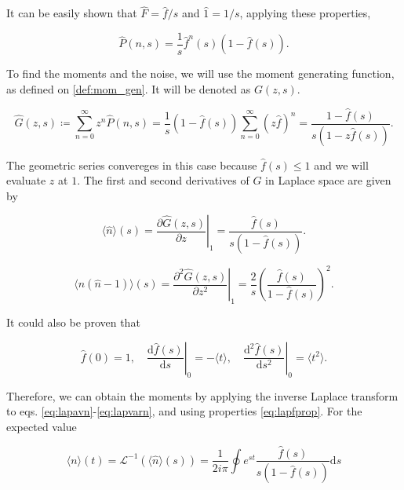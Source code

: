 It can be easily shown that $\hat{F} = \hat{f}/s$ and $\hat{1} = 1/s$, applying these properties,

\begin{equation}
  \label{eq:lapP}
  \hat{P}(n,s) = \frac{1}{s}\hat{f}^n(s)(1-\hat{f}(s)).
\end{equation}

To find the moments and the noise, we will use the moment generating function, as defined on \eqref{def:mom_gen}. It will be denoted as $G(z,s)$.

\begin{equation}
  \label{eq:lapG}
  \hat{G}(z,s) \coloneqq \sum_{n=0}^{\infty}z^n\hat{P}(n,s) = \frac{1}{s}(1-\hat{f}(s))\sum_{n=0}^{\infty}(z\hat{f})^n=\frac{1-\hat{f}(s)}{s(1-z\hat{f}(s))}.
\end{equation}

The geometric series convereges in this case because $\hat{f}(s)\leq1$ and we will evaluate $z$ at $1$. The first and second derivatives of $G$ in Laplace space are given by

\begin{equation}
  \label{eq:lapavn}
  \langle\hat{n}\rangle(s) = \left.\frac{\partial\hat{G}(z,s)}{\partial z}\right|_1 = \frac{\hat{f}(s)}{s(1-\hat{f}(s))}.
\end{equation}

\begin{equation}
  \label{eq:lapvarn}
  \langle\hat{n}(\hat{n}-1)\rangle(s) = \left.\frac{\partial^2\hat{G}(z,s)}{\partial z^2}\right|_1 = \frac{2}{s}\left(\frac{\hat{f}(s)}{1-\hat{f}(s)}\right)^2.
\end{equation}

It could also be proven that

\begin{equation}
  \label{eq:lapfprop}
  \hat{f}(0) = 1, \quad \left.\frac{\mathrm{d}\hat{f}(s)}{\mathrm{d}s}\right|_0=-\langle t\rangle,\quad \left.\frac{\mathrm{d}^2\hat{f}(s)}{\mathrm{d}s^2}\right|_0=\langle t^2\rangle.
\end{equation}

Therefore, we can obtain the moments by applying the inverse Laplace transform to eqs. \eqref{eq:lapavn}-\eqref{eq:lapvarn}, and using properties \eqref{eq:lapfprop}. For the expected value

\begin{equation}
  \langle n\rangle(t) = \mathcal{L}^{-1}(\langle\hat{n}\rangle(s))=\frac{1}{2i\pi}\oint e^{st}\frac{\hat{f}(s)}{s(1-\hat{f}(s))}\mathrm{d}s
\end{equation}

